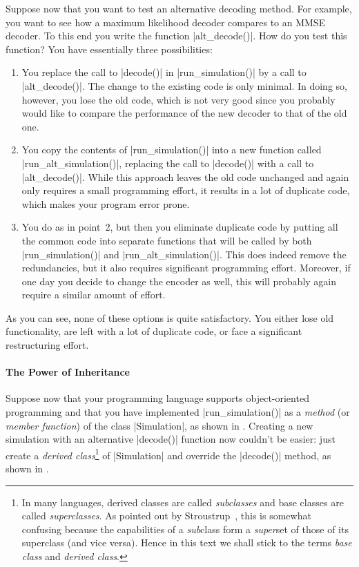Suppose now that you want to test an alternative decoding method. For example,
you want to see how a maximum likelihood decoder compares to an MMSE decoder. To
this end you write the function |alt_decode()|. How do you test this function?
You have essentially three possibilities:
\begin{enumerate}
  \item You replace the call to |decode()| in |run_simulation()| by a call to
    |alt_decode()|. The change to the existing code is only minimal. In doing
    so, however, you lose the old code, which is not very good since you
    probably would like to compare the performance of the new decoder to that of
    the old one. 

  \item You copy the contents of |run_simulation()| into a new function called
    |run_alt_simulation()|, replacing the call to |decode()| with a call to
    |alt_decode()|. While
    this approach leaves the old code unchanged and again only requires a small
    programming effort, it results in a lot of duplicate code, which makes your
    program error prone.

  \item You do as in point~2, but then you eliminate duplicate code by putting
    all the common code into separate functions that will be called by both
    |run_simulation()| and |run_alt_simulation()|. This does indeed remove the
    redundancies, but it also requires significant programming effort. Moreover,
    if one day you decide to change the encoder as well, this will probably
    again require a similar amount of effort. 
\end{enumerate}

As you can see, none of these options is quite satisfactory. You either lose old
functionality, are left with a lot of duplicate code, or face a significant
restructuring effort.


\paragraph{The Power of Inheritance}

Suppose now that your programming language supports object-oriented programming
and that you have implemented |run_simulation()| as a \emph{method} (or
\emph{member function}) of the class |Simulation|, as shown in
. Creating a new simulation with an alternative |decode()|
function now couldn't be easier: just create a \emph{derived class}\footnote{In
many languages, derived classes are called \emph{subclasses} and base classes
are called \emph{superclasses}. As pointed out by
Stroustrup~\cite{Stroustrup1997}, this is somewhat confusing because the
capabilities of a \emph{sub}class form a \emph{super}set of those of its
superclass (and vice versa). Hence in this text we shall stick to the terms
\emph{base class} and \emph{derived class}.} of |Simulation| and override the
|decode()| method, as shown in . 


